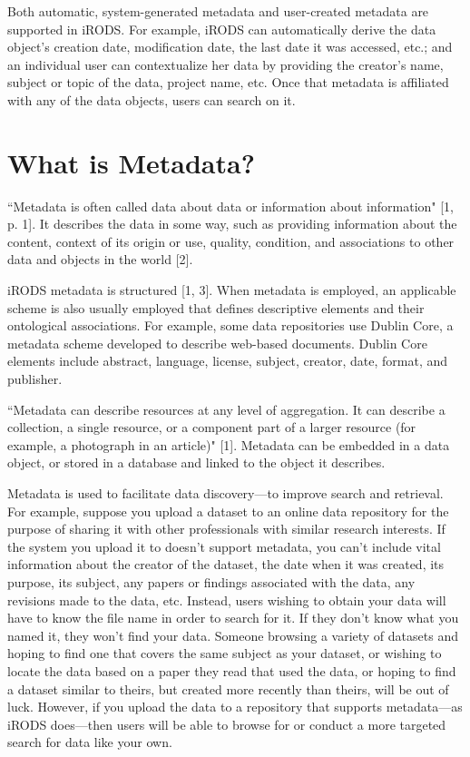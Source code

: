 \documentclass[10pt,oneside]{memoir}
\begin{document}
Both automatic, system-generated metadata and user-created metadata are supported in iRODS. For example, iRODS can automatically derive the data object's creation date, modification date, the last date it was accessed, etc.; and an individual user can contextualize her data by providing the creator's name, subject or topic of the data, project name, etc. Once that metadata is affiliated with any of the data objects, users can search on it.

\section{What is Metadata?}

``Metadata is often called data about data or information about information" [1, p. 1]. It describes the data in some way, such as providing information about the content, context of its origin or use, quality, condition, and associations to other data and objects in the world [2].

iRODS metadata is structured [1, 3]. When metadata is employed, an applicable scheme is also usually employed that defines descriptive elements and their ontological associations. For example, some data repositories use Dublin Core, a metadata scheme developed to describe web-based documents. Dublin Core elements include abstract, language, license, subject, creator, date, format, and publisher.

``Metadata can describe resources at any level of aggregation. It can describe a collection, a single resource, or a component part of a larger resource (for example, a photograph in an article)" [1]. Metadata can be embedded in a data object, or stored in a database and linked to the object it describes.

Metadata is used to facilitate data discovery---to improve search and retrieval. For example, suppose you upload a dataset to an online data repository for the purpose of sharing it with other professionals with similar research interests. If the system you upload it to doesn't support metadata, you can't include vital information about the creator of the dataset, the date when it was created, its purpose, its subject, any papers or findings associated with the data, any revisions made to the data, etc. Instead, users wishing to obtain your data will have to know the file name in order to search for it. If they don't know what you named it, they won't find your data. Someone browsing a variety of datasets and hoping to find one that covers the same subject as your dataset, or wishing to locate the data based on a paper they read that used the data, or hoping to find a dataset similar to theirs, but created more recently than theirs, will be out of luck. However, if you upload the data to a repository that supports metadata---as iRODS does---then users will be able to browse for or conduct a more targeted search for data like your own.
\end{document}
